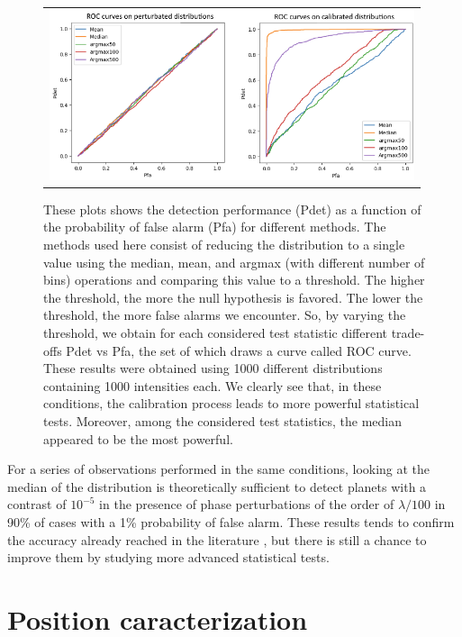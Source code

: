 \documentclass[]{spie}  %
\begin{document}
\begin{figure} [H]
    \begin{center}
    \begin{tabular}{c}
    \includegraphics[height=5cm]{img/ROC.png}
    \end{tabular}
    \end{center}
    \caption[ROC] 
    { \label{fig:ROC} 
    These plots shows the detection performance (Pdet) as a function of the probability of false alarm (Pfa) for different methods. The methods used here consist of reducing the distribution to a single value using the median, mean, and argmax (with different number of bins) operations and comparing this value to a threshold. The higher the threshold, the more the null hypothesis is favored. The lower the threshold, the more false alarms we encounter. So, by varying the threshold, we obtain for each considered test statistic different trade-offs Pdet vs Pfa, the set of which draws a curve called ROC curve. These results were obtained using 1000 different distributions containing 1000 intensities each. We clearly see that, in these conditions, the calibration process leads to more powerful statistical tests. Moreover, among the considered test statistics, the median appeared to be the most powerful.}
\end{figure}

For a series of observations performed in the same conditions, looking at the median of the distribution is theoretically sufficient to detect planets with a contrast of $10^{-5}$ in the presence of phase perturbations of the order of $\lambda / 100$ in 90\% of cases with a 1\% probability of false alarm. These results tends to confirm the accuracy already reached in the literature \cite{Cvetojevic et al. 2022}, but there is still a chance to improve them by studying more advanced statistical tests.

\section{Position caracterization}
\end{document}
